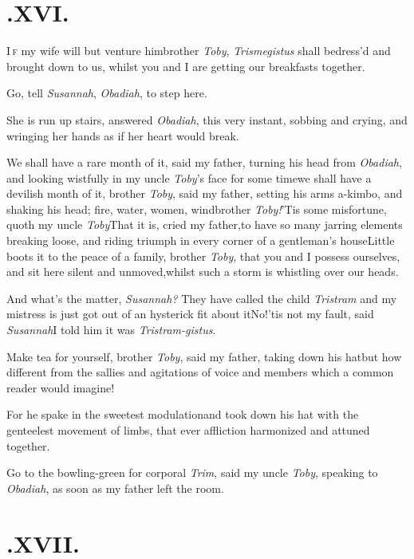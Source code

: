\documentclass{article}
\begin{document}
\bigskip
\section{.\enspace XVI.}

\lettrine{I}{\,f} my wife will but venture
him\tsk brother \textit{Toby}, \textit{Trismegistus} shall
be\break dress’d
and brought down to us, whilst you and I are getting our breakfasts
together.\tsk

\tsk Go, tell \textit{Susannah}, \textit{Obadiah}, to step
here.

She is run up stairs, answered \textit{Obadiah}, this very
instant, sobbing and crying, and wringing her hands as if her heart
would break.\tsh

\newpage
We shall have a rare month of it, said my father, turning his
head from \textit{Obadiah}, and looking wistfully in my uncle
\textit{Toby}’s face for some time\tsk we shall have a
devilish month of it, brother \textit{Toby}, said my father, setting
his arms a-kimbo, and shaking his head; fire, water, women,
wind\tsk brother \textit{Toby!}\tsk ’Tis some misfortune,
quoth my uncle \textit{Toby}\tsk That it is, cried my
father,\tsk to have so many jarring elements breaking loose, and
riding triumph in every corner of a gentleman’s house\tsk Little boots it to the peace
of a family, brother \textit{Toby}, that you and I possess ourselves,
and sit here silent and unmoved,\tsh whilst such a storm is
whistling over our heads.\tsh

And what’s the matter, \textit{Susannah?}\break
They have called the child \textit{Tristram}\tsh\break
and my mistress is just got out of an\pb
hysterick fit about
it\tsk No!\tsk ’tis not my fault, said
\textit{Susannah}\tsk I told him it was \textit{Tristram-gistus}.

\tsh Make tea for yourself, brother \textit{Toby}, said
my father, taking down his hat\tsk but how different from
the sallies and agitations of voice and members which a common
reader would imagine!

\tsk For he spake in the sweetest modulation\tsk and took
down his hat with the genteelest movement of limbs, that ever
affliction harmonized and attuned together.

\tsh Go to the bowling-green for corporal \textit{Trim},
said my uncle \textit{Toby}, speaking to \textit{Obadiah}, as soon as
my father left the room.

\newpage
\null\smallskip
\section{.\enspace XVII.}
\end{document}
